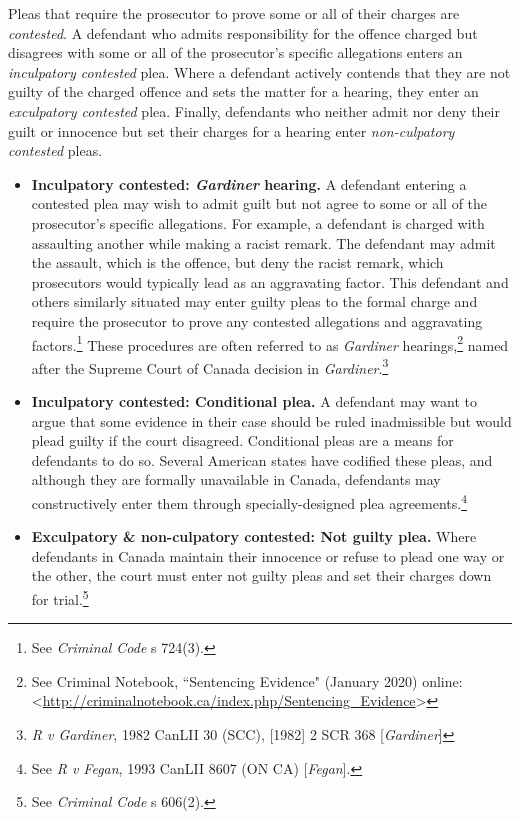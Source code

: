 Pleas that require the prosecutor to prove some or all of their charges are \textit{contested}. A defendant who admits responsibility for the offence charged but disagrees with some or all of the prosecutor's specific allegations enters an \textit{inculpatory contested} plea. Where a defendant actively contends that they are not guilty of the charged offence and sets the matter for a hearing, they enter an \textit{exculpatory contested} plea. Finally, defendants who neither admit nor deny their guilt or innocence but set their charges for a hearing enter \textit{non-culpatory contested} pleas.

\begin{itemize}
    \item \textbf{Inculpatory contested: \textit{Gardiner} hearing.} A defendant entering a contested plea may wish to admit guilt but not agree to some or all of the prosecutor's specific allegations. For example, a defendant is charged with assaulting another while making a racist remark. The defendant may admit the assault, which is the offence, but deny the racist remark, which prosecutors would typically lead as an aggravating factor. This defendant and others similarly situated may enter guilty pleas to the formal charge and require the prosecutor to prove any contested allegations and aggravating factors.\footnote{See \textit{Criminal Code} s 724(3).} These procedures are often referred to as \textit{Gardiner} hearings,\footnote{See Criminal Notebook, ``Sentencing Evidence" (January 2020) online: \textless \url{http://criminalnotebook.ca/index.php/Sentencing_Evidence}\textgreater} named after the Supreme Court of Canada decision in \textit{Gardiner}.\footnote{\textit{R v Gardiner}, 1982 CanLII 30 (SCC), [1982] 2 SCR 368 [\textit{Gardiner}]}
    
    \item \textbf{Inculpatory contested: Conditional plea.} A defendant may want to argue that some evidence in their case should be ruled inadmissible but would plead guilty if the court disagreed. Conditional pleas are a means for defendants to do so. Several American states have codified these pleas, and although they are formally unavailable in Canada, defendants may constructively enter them through specially-designed plea agreements.\footnote{See \textit{R v Fegan}, 1993 CanLII 8607 (ON CA) [\textit{Fegan}].}
    
    \item \textbf{Exculpatory \& non-culpatory contested: Not guilty plea.} Where defendants in Canada maintain their innocence or refuse to plead one way or the other, the court must enter not guilty pleas and set their charges down for trial.\footnote{See \textit{Criminal Code} s 606(2).} 
    
\end{itemize}

